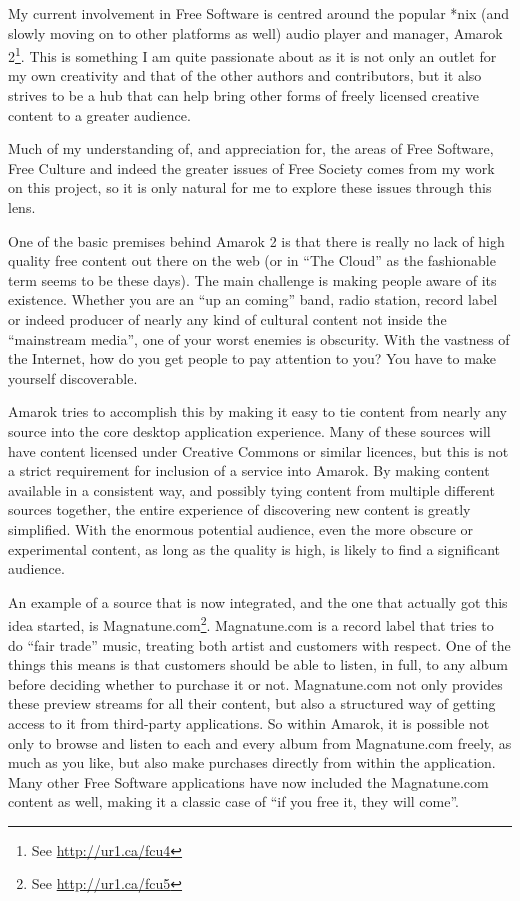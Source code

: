 My current involvement in Free Software is centred around the popular *nix (and
slowly moving on to other platforms as well) audio player and manager, Amarok
2\footnote{See \url{http://ur1.ca/fcu4}}. This is something I am quite passionate
about as it is not only an outlet for my own creativity and that of the other
authors and contributors, but it also strives to be a hub that can help bring
other forms of freely licensed creative content to a greater audience.

Much of my understanding of, and appreciation for, the areas of Free Software,
Free Culture and indeed the greater issues of Free Society comes from my work on
this project, so it is only natural for me to explore these issues through this
lens.

One of the basic premises behind Amarok 2 is that there is really no lack of
high quality free content out there on the web (or in ``The Cloud'' as the
fashionable term seems to be these days). The main challenge is making people
aware of its existence. Whether you are an ``up an coming'' band, radio station,
record label or indeed producer of nearly any kind of cultural content not
inside the ``mainstream media'', one of your worst enemies is obscurity. With
the vastness of the Internet, how do you get people to pay attention to you? You
have to make yourself discoverable.

Amarok tries to accomplish this by making it easy to tie content from nearly any
source into the core desktop application experience. Many of these sources will
have content licensed under Creative Commons or similar licences, but this is
not a strict requirement for inclusion of a service into Amarok. By making
content available in a consistent way, and possibly tying content from multiple
dif\hbox{}ferent sources together, the entire experience of discovering new
content is greatly simplif\hbox{}ied. With the enormous potential audience, even
the more obscure or experimental content, as long as the quality is high, is
likely to f\hbox{}ind a signif\hbox{}icant audience.

An example of a source that is now integrated, and the one that actually got
this idea started, is Magnatune.com\footnote{See \url{http://ur1.ca/fcu5}}.
Magnatune.com is a record label that tries to do ``fair trade'' music, treating
both artist and customers with respect. One of the things this means is that
customers should be able to listen, in full, to any album before deciding
whether to purchase it or not. Magnatune.com not only provides these preview
streams for all their content, but also a structured way of getting access to it
from third-party applications. So within Amarok, it is possible not only to
browse and listen to each and every album from Magnatune.com freely, as much as
you like, but also make purchases directly from within the application. Many
other Free Software applications have now included the Magnatune.com content as
well, making it a classic case of ``if you free it, they will come''.

